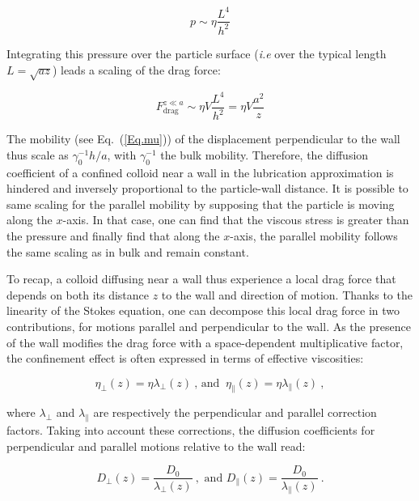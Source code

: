 \begin{equation}
	p \sim \eta  \frac{L^4}{h^2}
\end{equation}

Integrating this pressure over the particle surface (\textit{i.e} over the typical length $L = \sqrt{az}$) leads a scaling of the drag force:

\begin{equation}
	F_\mathrm{drag} ^{z\ll a} \sim \eta V \frac{L^4}{h^2} = \eta V \frac{a^2}{z}
\end{equation}

The mobility (see Eq.~(\ref{Eq.mu})) of the displacement perpendicular to the wall  thus scale as $\gamma_0^{-1} h/a$, with $\gamma_0^{-1}$ the bulk mobility. Therefore, the diffusion coefficient of a confined colloid near a wall in the lubrication approximation is hindered and inversely proportional to the particle-wall distance. It is possible to same scaling for the parallel mobility by supposing that the particle is moving along the $x$-axis. In that case, one can find that the viscous stress is greater than the pressure and finally find that along the $x$-axis, the parallel mobility follows the same scaling as in bulk and remain constant.

To recap, a colloid diffusing near a wall thus experience a local drag force that depends on both its distance $z$ to the wall and direction of motion. Thanks to the linearity of the Stokes equation, one can decompose this local drag force in two contributions, for motions parallel and perpendicular to the wall. As the presence of the wall modifies the drag force with a space-dependent multiplicative factor, the confinement effect is often expressed in terms of effective viscosities:

\begin{equation}
	\eta _\bot (z) = {\eta}{\lambda _ \bot (z)}  ~ \text{, and } ~\eta _\parallel (z) =  {\eta}{\lambda _ \parallel (z)}~,
\end{equation}

where $\lambda _\bot$ and $\lambda _\parallel$ are respectively the perpendicular and parallel correction factors. Taking into account these corrections, the diffusion coefficients for perpendicular and parallel motions relative to the wall read:

\begin{equation}
	D_\bot (z) =  \frac{D_0}{\lambda _\bot (z)}  ~, \text{ and } D_\parallel (z) = \frac{D_0}{ \lambda_\parallel (z)} ~.
	\label{Eq.hindered}
\end{equation}

